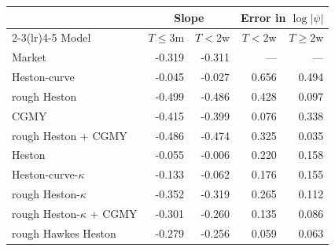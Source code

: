 \begin{tabular}{lrrrr}
\toprule
 & \multicolumn{2}{c}{Slope} & \multicolumn{2}{c}{Error in $\log|\psi|$}\\
\cmidrule(lr){2-3}\cmidrule(lr){4-5}
Model & $T\le 3$m & $T<2$w & $T<2$w & $T\ge 2$w\\
\midrule
Market & -0.319 & -0.311 & --- & ---\\
\addlinespace
Heston-curve & -0.045 & -0.027 & 0.656 & 0.494\\
rough Heston & -0.499 & -0.486 & 0.428 & 0.097\\
CGMY & -0.415 & -0.399 & 0.076 & 0.338\\
rough Heston + CGMY & -0.486 & -0.474 & 0.325 & 0.035\\
\addlinespace
Heston & -0.055 & -0.006 & 0.220 & 0.158\\
Heston-curve-$\kappa$ & -0.133 & -0.062 & 0.176 & 0.155\\
rough Heston-$\kappa$ & -0.352 & -0.319 & 0.265 & 0.112\\
rough Heston-$\kappa$ + CGMY & -0.301 & -0.260 & 0.135 & 0.086\\
rough Hawkes Heston & -0.279 & -0.256 & 0.059 & 0.063\\
\bottomrule
\end{tabular}
